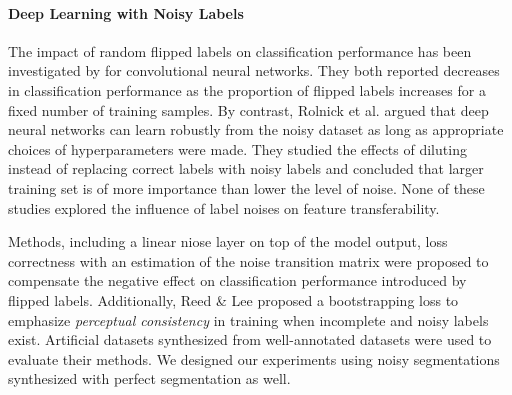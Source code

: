
\paragraph{Deep Learning with Noisy Labels}

The impact of random flipped labels on classification performance has been investigated by \cite{sukhbaatar2014training,patrini2016making} for convolutional neural networks.
They both reported decreases in classification performance as the proportion of flipped labels increases for a fixed number of training samples.
By contrast, Rolnick et al.\cite{rolnick2017deep} argued that deep neural networks can learn robustly from the noisy dataset as long as appropriate choices of hyperparameters were made.
They studied the effects of diluting instead of replacing correct labels with noisy labels and concluded that larger training set is of more importance than lower the level of noise.
None of these studies explored the influence of label noises on feature transferability.

Methods, including a linear niose layer on top of the model output\cite{sukhbaatar2014training}, loss correctness with an estimation of the noise transition matrix\cite{patrini2016making} were proposed to compensate the negative effect on classification performance introduced by flipped labels.
Additionally, Reed \& Lee\cite{reed2014training} proposed a bootstrapping loss to emphasize \textit{perceptual consistency} in training when incomplete and noisy labels exist.
Artificial datasets synthesized from well-annotated datasets were used to evaluate their methods.
We designed our experiments using noisy segmentations synthesized with perfect segmentation as well.


